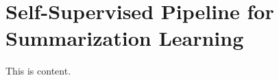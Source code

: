 \section{Self-Supervised Pipeline for Summarization Learning}
\label{section:method-pipeline}

This is content.